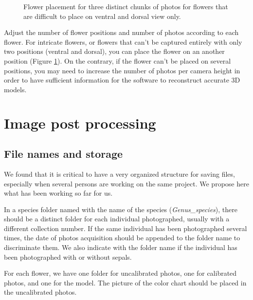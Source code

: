 \documentclass[10pt,letter,english]{article}
\begin{document}
\begin{figure}[H]
\begin{subfigure}[t]{.33\textwidth}
  \caption{}
  \label{3placement}
\end{subfigure}
\caption{Flower placement for three distinct chunks of photos for flowers that are difficult to place on ventral and dorsal view only.}
\label{flowerplacement}
\end{figure}



\begin{tcolorbox}[width=\linewidth, colback=mygray,title=Suggestion for the Joly Lab,colframe=lightgray] %
Adjust the number of flower positions and number of photos according to each flower. For intricate flowers, or flowers that can't be captured entirely with only two positions (ventral and dorsal), you can place the flower on an another position (Figure \ref{3placement}). On the contrary, if the flower can't be placed on several positions, you may need to increase the number of photos per camera height in order to have sufficient information for the software to reconstruct accurate 3D models.
\end{tcolorbox}






\section{Image post processing}
\subsection{File names and storage}


We found that it is critical to have a very organized structure for saving files, especially when several persons are working on the same project. We propose here what has been working so far for us.

In a species folder named with the name of the species (\textit{Genus\_species}), there should be a distinct folder for each individual photographed, usually with a different collection number. If the same individual has been photographed several times, the date of photos acquisition should be appended to the folder name to discriminate them. We also indicate with the folder name if the individual has been photographed with or without sepals.

For each flower, we have one folder for uncalibrated photos, one for calibrated photos, and one for the model. The picture of the color chart should be placed in the uncalibrated photos.
\end{document}
